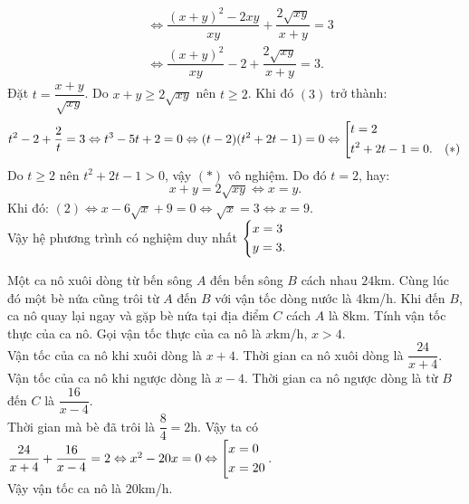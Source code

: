 \begin{ex}
{\begin{enumerate}
{\begin{align*}
    		&\Leftrightarrow \dfrac{(x+y)^2-2xy}{xy}+\dfrac{2\sqrt{xy}}{x+y}=3\\		&\Leftrightarrow \dfrac{(x+y)^2}{xy}-2+\dfrac{2\sqrt{xy}}{x+y}=3.\tag{3}
    		\end{align*}}
    		Đặt $t=\dfrac{x+y}{\sqrt{xy}}$. Do $x+y\ge2\sqrt{xy}$ nên $t\ge2$. Khi đó $(3)$ trở thành:
    		$$t^2-2+\dfrac{2}{t}=3\Leftrightarrow t^3-5t+2=0\Leftrightarrow(t-2)(t^2+2t-1)=0\Leftrightarrow\left[\begin{aligned}&t=2&&\\&t^2+2t-1=0.&&(*)\end{aligned}\right.$$
    		Do $t\ge2$ nên $t^2+2t-1>0$, vậy $(*)$ vô nghiệm. Do đó
    	$t=2$, hay:
    	$$x+y=2\sqrt{xy}\Leftrightarrow x=y.$$
    	Khi đó:
    		$(2)\Leftrightarrow x-6\sqrt{x}+9=0\Leftrightarrow\sqrt{x}=3\Leftrightarrow x=9$.\\
    		Vậy hệ phương trình có nghiệm duy nhất $\left\{\begin{aligned}&x=3\\&y=3.\end{aligned}\right.$
    \end{enumerate}}
\end{ex}

\begin{ex}%
    Một ca nô xuôi dòng từ bến sông $A$ đến bến sông $B$ cách nhau $24$km. Cùng lúc đó một bè nứa cũng trôi từ $A$ đến $B$ với vận tốc dòng nước là $4$km/h. Khi đến $B$, ca nô quay lại ngay và gặp bè nứa tại địa điểm $C$ cách $A$ là $8$km. Tính vận tốc thực của ca nô.
\loigiai
    {Gọi vận tốc thực của ca nô là $x$km/h, $x>4$.\\
    Vận tốc của ca nô khi xuôi dòng là $x+4$. Thời gian ca nô xuôi dòng là $\dfrac{24}{x+4}$. \\
Vận tốc của ca nô khi ngược dòng là $x-4$. Thời gian ca nô ngược dòng là từ $B$ đến $C$ là $ \dfrac{16}{x-4} $.\\
Thời gian mà bè đã trôi là $\dfrac{8}{4}=2$h.
Vậy ta có $\dfrac{24}{x+4}+\dfrac{16}{x-4}=2\Leftrightarrow x^2-20x=0\Leftrightarrow\left[\begin{aligned}&x=0\\&x=20\end{aligned}\right.$.\\
Vậy vận tốc ca nô là $20$km/h.}
\end{ex}

